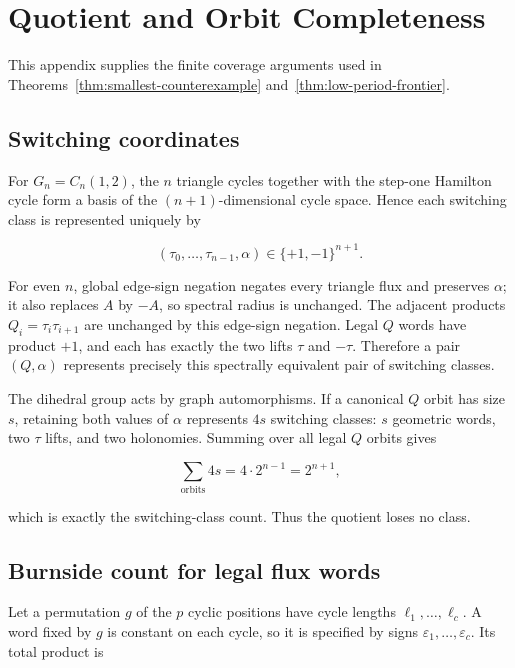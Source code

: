 \section{Quotient and Orbit Completeness}\label{app:orbit-completeness}

This appendix supplies the finite coverage arguments used in Theorems~\ref{thm:smallest-counterexample} and~\ref{thm:low-period-frontier}.

\subsection{Switching coordinates}

For \(G_n=C_n(1,2)\), the \(n\) triangle cycles together with the step-one
Hamilton cycle form a basis of the \((n+1)\)-dimensional cycle space. Hence each
switching class is represented uniquely by

\begin{equation}
\label{eq:cycle-coordinate-space}
(\tau_{0},\ldots,\tau_{n-1},\alpha) \in \{+1,-1\}^{n+1}.
\end{equation}

For even \(n\), global edge-sign negation negates every triangle flux and
preserves \(\alpha\); it also replaces \(A\) by \(-A\), so spectral radius is
unchanged. The adjacent products \(Q_i=\tau_i \tau_{i+1}\) are unchanged by this
edge-sign negation. Legal \(Q\) words have product \(+1\), and each has exactly the two lifts
\(\tau\) and \(-\tau\). Therefore a pair \((Q,\alpha)\) represents precisely this
spectrally equivalent pair of switching classes.

The dihedral group acts by graph automorphisms. If a canonical \(Q\) orbit has
size \(s\), retaining both values of \(\alpha\) represents \(4s\) switching classes:
\(s\) geometric words, two \(\tau\) lifts, and two holonomies. Summing over all
legal \(Q\) orbits gives

\begin{equation}
\label{eq:orbit-weight-identity}
\sum_{\mathrm{orbits}} 4s = 4\cdot 2^{n-1}=2^{n+1},
\end{equation}

which is exactly the switching-class count. Thus the quotient loses no class.

\subsection{Burnside count for legal flux words}

Let a permutation \(g\) of the \(p\) cyclic positions have cycle lengths
\(\ell_{1},\ldots,\ell_c\). A word fixed by \(g\) is constant on each cycle, so it is
specified by signs \(\varepsilon_{1},\ldots,\varepsilon_c\). Its total product is

